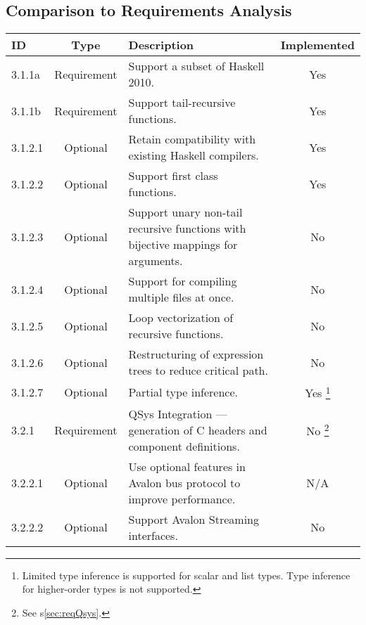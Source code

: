 \documentclass[english,onecolumn]{scrartcl}
\begin{document}
\subsection{Comparison to Requirements Analysis}
\begin{tabularx}{\textwidth}{l c X c}
\toprule
ID      & Type              & Description                 & Implemented
\\ \midrule

3.1.1a  & Requirement & Support a subset of Haskell 2010. & Yes
\\ \midrule

3.1.1b  & Requirement & Support tail-recursive functions. & Yes
\\ \midrule

3.1.2.1 & Optional    & Retain compatibility with existing Haskell compilers. & Yes
\\ \midrule

3.1.2.2 & Optional    & Support first class functions. & Yes
\\ \midrule

3.1.2.3 & Optional    & Support unary non-tail recursive functions with bijective mappings for arguments. & No
\\ \midrule

3.1.2.4 & Optional    & Support for compiling multiple files at once. & No
\\ \midrule

3.1.2.5 & Optional    & Loop vectorization of recursive functions. & No
\\ \midrule

3.1.2.6 & Optional    & Restructuring of expression trees to reduce critical path. & No
\\ \midrule

3.1.2.7 & Optional    & Partial type inference. & Yes%
\footnote{Limited type inference is supported for scalar and list types. Type inference for higher-order types is not supported.}
\\ \midrule

3.2.1   & Requirement & QSys Integration --- generation of C headers and component definitions. & No%
\footnote{See s\ref{sec:reqQsys}.}
\\ \midrule

3.2.2.1 & Optional    & Use optional features in Avalon bus protocol to improve performance. & N/A
\\ \midrule

3.2.2.2 & Optional    & Support Avalon Streaming interfaces. & No
\\ \midrule


\end{tabularx}
\end{document}
